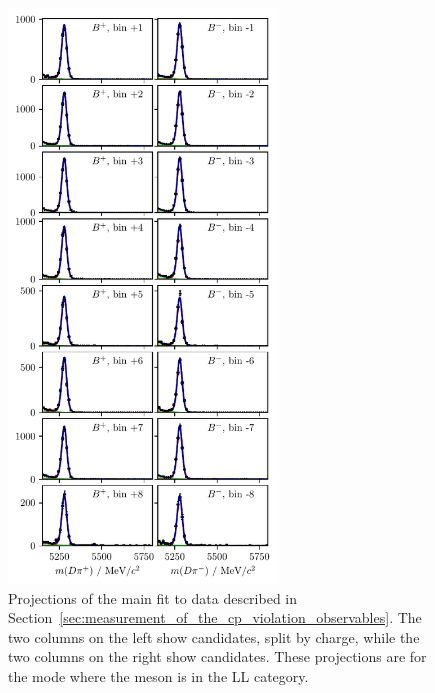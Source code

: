 \begin{figure}[tp]
    \includegraphics[height=6in]{figures/analysis/bin_by_bin/pretty_fit_bins_dpi_LL_2.pdf}
    \caption{Projections of the main fit to data described in Section~\ref{sec:measurement_of_the_cp_violation_observables}. The two columns on the left show \BtoDK candidates, split by charge, while the two columns on the right show \BtoDpi candidates. These projections are for the \DtoKspp mode where the \KS meson is in the LL category.}
\end{figure}


